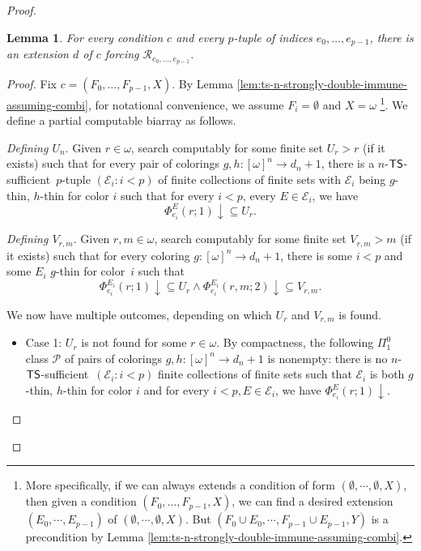 \documentclass{amsart}
\newtheorem{lemma}[theorem]{Lemma}
\theoremstyle{definition}
\theoremstyle{remark}
\numberwithin{equation}{section}
\theoremstyle{noparens}
\def\mcal{\mathcal}
\newcommand{\Pcal}{\mathcal{P}}
\newcommand{\Rcal}{\mathcal{R}}
\newcommand{\s}[1]{\ensuremath{\sf{#1}}}
\DeclareMathOperator{\ts}{\s{TS}}
\def\tssufficient{$\ts$-sufficient}
\begin{document}
\begin{proof}
\begin{lemma}\label{lem:ts-n-strongly-double-immune-assuming-force-R}
For every condition $c$ and every $p$-tuple of indices $e_0, \dots, e_{p-1}$,
there is an extension $d$ of $c$ forcing $\Rcal_{e_0, \dots, e_{p-1}}$.
\end{lemma}
\begin{proof}
Fix $c = (F_0, \dots, F_{p-1}, X)$.
By Lemma \ref{lem:ts-n-strongly-double-immune-assuming-combi},
for notational convenience, we assume $F_i=\emptyset$ and $X=\omega$
\footnote{More specifically, if we can always extends a condition of form $(\emptyset,\cdots,\emptyset,X)$,
then given a condition $(F_0, \dots, F_{p-1}, X)$,
we can find a desired extension $(E_0,\cdots,E_{p-1})$ of $(\emptyset,\cdots,\emptyset,X)$.
But $(F_0\cup E_0,\cdots,F_{p-1}\cup E_{p-1},Y)$ is a precondition by Lemma \ref{lem:ts-n-strongly-double-immune-assuming-combi}.}.
We define a partial computable biarray as follows.
\bigskip

\emph{Defining $U_n$}.
Given $r \in \omega$, search  computably for some
finite  set $U_r>r$ (if it exists) such that
for every pair of colorings $g, h : [\omega]^n \to d_n+1$,
there
is a $n$-\tssufficient\ $p$-tuple $(\mcal{E}_i:i<p) $ of
finite collections of finite sets
with $\mcal{E}_i$ being $g$-thin, $h$-thin   for color $i$
such that for every $i<p$, every $E\in\mcal{E}_i$, we have
$$
\Phi_{e_i}^{  E }(r;1) \downarrow \subseteq U_r.
$$

\emph{Defining $V_{r,m}$}. Given $r, m \in \omega$, search  computably for some
finite  set $V_{r,m}>m$ (if it exists) such that for every
coloring $g : [\omega]^n \to d_n+1$, there is some $i < p$ and some $E_i  $
$g$-thin for color~$i$ such that
$$
\Phi_{e_i}^{  E_i }(r;1) \downarrow \subseteq U_r
	\wedge \Phi_{e_i}^{E_i }(r, m;2) \downarrow \subseteq V_{r,m}.
$$
\smallskip

We now have multiple outcomes, depending on which $U_r$ and $V_{r,m}$ is found.

\begin{itemize}
	\item Case 1: $U_r$ is not found for some $r \in \omega$. By compactness, the following $\Pi^{0}_1$ class
	$\Pcal$ of   pairs of colorings $g, h : [\omega]^n \to d_n+1$ is nonempty:
	 there
is no $n$-\tssufficient\ $(\mcal{E}_i:i<p)$
finite collections of finite sets
such that $\mcal{E}_i$ is both $g$-thin, $h$-thin for color $i$
and for every $i<p,E\in\mcal{E}_i$, we have
	$
	\Phi_{e_i}^{ E}(r;1) \downarrow.
	$


\end{itemize}
\end{proof}
\end{proof}
\end{document}
